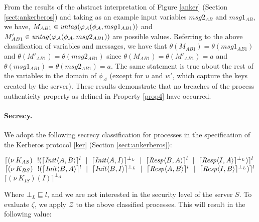 \documentclass[10pt,a4paper,final,oneside,fleqn]{book}
\begin{document}
\noindent
From the results of the abstract interpretation of Figure \ref{anker} (Section \ref{sect:ankerberos}) and taking as an example input variables $msg2_{AB}$ and $msg1_{AB}$, we have, $M_{AB1}\in\mbox{{\itshape untag\/}}(\varphi_\mathcal{A}(\phi_\mathcal{A},msg1_{AB1}))$ and $M'_{AB1}\in\mbox{{\itshape untag\/}}(\varphi_\mathcal{A}(\phi_\mathcal{A},msg2_{AB1}))$ are possible values.  Referring to the above classification of variables and messages, we have that $\theta(M_{AB1})=\theta(msg1_{AB1})$ and $\theta(M'_{AB1})=\theta(msg2_{AB1})$ since $\theta(M_{AB1})=\theta(M'_{AB1})=a$ and $\theta(msg1_{AB1})=\theta(msg2_{AB1})=a$.  The same statement is true about the rest of the variables in the domain of $\phi_\mathcal{A}$ (except for $u$ and $w'$, which capture the keys created by the server).  These results demonstrate that no breaches of the process authenticity property as defined in Property \ref{prop4} have occurred.

\paragraph{Secrecy.} We adopt the following secrecy classification for processes in the specification of the Kerberos protocol \ref{ker} (Section \ref{sect:ankerberos}):\vspace{6mm}

\noindent
$\lceil (\nu~\!K_{AS})~~!(\lceil \mbox{{\itshape Init\/}}\langle A,B\rangle\rceil^l~\mid~\lceil \mbox{{\itshape Init\/}}\langle A,I\rangle\rceil^{\bot_L}~\mid~\lceil \mbox{{\itshape Resp\/}}\langle B,A\rangle\rceil^{l}~\mid~\lceil \mbox{{\itshape Resp\/}}\langle I,A\rangle\rceil^{\bot_L})\rceil^l$\\
$\lceil (\nu~\!K_{BS})~~!(\lceil \mbox{{\itshape Init\/}}\langle B,A\rangle\rceil^l~\mid~\lceil \mbox{{\itshape Init\/}}\langle B,I\rangle\rceil^{\bot_L}~\mid~\lceil \mbox{{\itshape Resp\/}}\langle A,B\rangle\rceil^l~\mid~\lceil \mbox{{\itshape Resp\/}}\langle I,B\rangle\rceil^{\bot_L})\rceil^l$\\
$\lceil (\nu~\!K_{IS})(I)\rceil^{\bot_A}$\vspace{6mm}

\noindent
Where $\bot_L\sqsubseteq l$, and we are not interested in the security level of the server $S$. To evaluate $\zeta$, we apply $\mathcal{Z}$ to the above classified processes.  This will result in the following value:\vspace{6mm}
\end{document}
